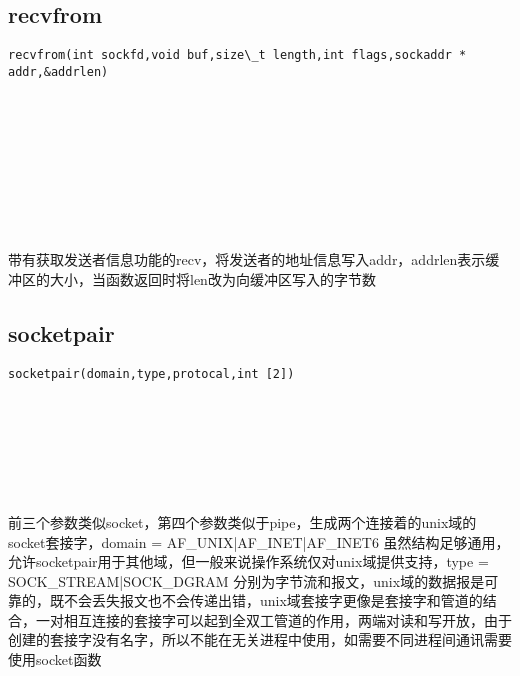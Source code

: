 \documentclass[10pt,a4paper]{article}
\begin{document}
\subsection{recvfrom}
\begin{spacing}{2.0}
\lstset{language=C,numbers=none}
\begin{lstlisting}
recvfrom(int sockfd,void buf,size\_t length,int flags,sockaddr * addr,&addrlen)
\end{lstlisting}
{\large\color[rgb]{0.2,0.4,0.6}{sockfd:}} \\
{\large\color[rgb]{0.2,0.4,0.6}{buf:}} \\
{\large\color[rgb]{0.2,0.4,0.6}{length:}} \\
{\large\color[rgb]{0.2,0.4,0.6}{flags:}} \\
{\large\color[rgb]{0.2,0.4,0.6}{addr:}} \\
{\large\color[rgb]{0.2,0.4,0.6}{\&addrlen:}}
\paragraph{ \ \ }带有获取发送者信息功能的recv，将发送者的地址信息写入addr，addrlen表示缓冲区的大小，当函数返回时将len改为向缓冲区写入的字节数
\end{spacing}

\subsection{socketpair}
\begin{spacing}{2.0}
\lstset{language=C,numbers=none}
\begin{lstlisting}
socketpair(domain,type,protocal,int [2])
\end{lstlisting}
{\large\color[rgb]{0.2,0.4,0.6}{domain:}} \\
{\large\color[rgb]{0.2,0.4,0.6}{type:}} \\
{\large\color[rgb]{0.2,0.4,0.6}{protocal:}} \\
{\large\color[rgb]{0.2,0.4,0.6}{[2]:}}
\paragraph{ \ \ }前三个参数类似socket，第四个参数类似于pipe，生成两个连接着的unix域的socket套接字，domain = AF\_UNIX|AF\_INET|AF\_INET6 虽然结构足够通用，允许socketpair用于其他域，但一般来说操作系统仅对unix域提供支持，type = SOCK\_STREAM|SOCK\_DGRAM 分别为字节流和报文，unix域的数据报是可靠的，既不会丢失报文也不会传递出错，unix域套接字更像是套接字和管道的结合，一对相互连接的套接字可以起到全双工管道的作用，两端对读和写开放，由于创建的套接字没有名字，所以不能在无关进程中使用，如需要不同进程间通讯需要使用socket函数
\end{spacing}
\end{document}
